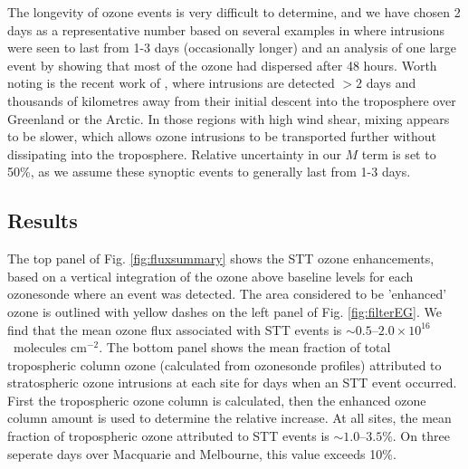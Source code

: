 \documentclass[acp, manuscript]{copernicus} %
\begin{document}
    The longevity of ozone events is very difficult to determine, and we have chosen 2 days as a representative number based on several examples in \cite{Lin2012} where intrusions were seen to last from 1-3 days (occasionally longer) and an analysis of one large event by \cite{Cooper2004} showing that most of the ozone had dispersed after 48 hours.
    Worth noting is the recent work of \cite{Trickl2014}, where intrusions are detected $>2$ days and thousands of kilometres away from their initial descent into the troposphere over Greenland or the Arctic.
    In those regions with high wind shear, mixing appears to be slower, which allows ozone intrusions to be transported further without dissipating into the troposphere.
    Relative uncertainty in our $M$ term is set to 50\%, as we assume these synoptic events to generally last from 1-3 days.

  \subsection{Results}

    The top panel of Fig. \ref{fig:fluxsummary} shows the STT ozone enhancements, based on a vertical integration of the ozone above baseline levels for each ozonesonde where an event was detected.
    The area considered to be 'enhanced' ozone is outlined with yellow dashes on the left panel of Fig. \ref{fig:filterEG}.
    We find that the mean ozone flux associated with STT events is $\sim 0.5$--$2.0 \times 10^{16}$~molecules cm$^{-2}$.
    The bottom panel shows the mean fraction of total tropospheric column ozone (calculated from ozonesonde profiles) attributed to stratospheric ozone intrusions at each site for days when an STT event occurred.
    First the tropospheric ozone column is calculated, then the enhanced ozone column amount is used to determine the relative increase.
    At all sites, the mean fraction of tropospheric ozone attributed to STT events is $\sim 1.0$--$3.5\%$.
    On three seperate days over Macquarie and Melbourne, this value exceeds 10\%.
\end{document}
